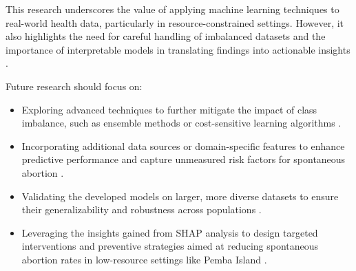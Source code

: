 \documentclass{article}
\begin{document}
This research underscores the value of applying machine learning techniques to real-world health data, particularly in resource-constrained settings. However, it also highlights the need for careful handling of imbalanced datasets and the importance of interpretable models in translating findings into actionable insights \cite{aftab2021}.

Future research should focus on:
\begin{itemize}
    \item Exploring advanced techniques to further mitigate the impact of class imbalance, such as ensemble methods or cost-sensitive learning algorithms \cite{aljameel2023}.
    \item Incorporating additional data sources or domain-specific features to enhance predictive performance and capture unmeasured risk factors for spontaneous abortion \cite{wu2024}.
    \item Validating the developed models on larger, more diverse datasets to ensure their generalizability and robustness across populations \cite{setegn2024}.
    \item Leveraging the insights gained from SHAP analysis to design targeted interventions and preventive strategies aimed at reducing spontaneous abortion rates in low-resource settings like Pemba Island \cite{aftab2021}.
\end{itemize}

\newpage
\end{document}
